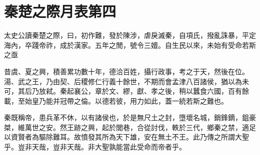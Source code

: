 \chapter{秦楚之際月表第四}
			
太史公讀秦楚之際，曰，初作難，發於陳涉，虐戾滅秦，自項氏，撥亂誅暴，平定海內，卒踐帝祚，成於漢家。五年之閒，號令三嬗。自生民以來，未始有受命若斯之亟

昔虞、夏之興，積善累功數十年，德洽百姓，攝行政事，考之于天，然後在位。湯、武之王，乃由契、后稷修仁行義十餘世，不期而會孟津八百諸侯，猶以為未可，其后乃放弒。秦起襄公，章於文、繆，獻、孝之後，稍以蠶食六國，百有餘載，至始皇乃能并冠帶之倫。以德若彼，用力如此，蓋一統若斯之難也。

秦既稱帝，患兵革不休，以有諸侯也，於是無尺土之封，墮壞名城，銷鋒鏑，鉏豪桀，維萬世之安。然王跡之興，起於閭巷，合從討伐，軼於三代，鄉秦之禁，適足以資賢者為驅除難耳。故憤發其所為天下雄，安在無土不王。此乃傳之所謂大聖乎。豈非天哉，豈非天哉。非大聖孰能當此受命而帝者乎。

